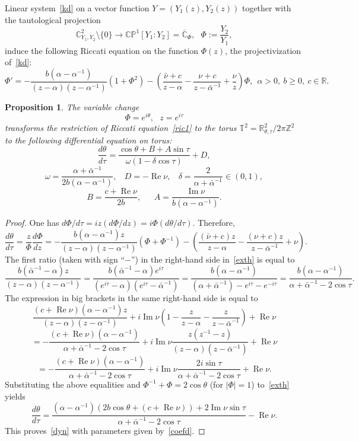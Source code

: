 \documentclass[preprint,12pt]{elsarticle}
\theoremstyle{plain}
\newtheorem{proposition}[theorem]{Proposition}
\DeclareMathOperator{\im}{\mathrm{Im}}
\DeclareMathOperator{\re}{\mathrm{Re}}
\def\a{\alpha}
\def\ba{\bar\alpha}
\def\bam{\ba^{-1}}
\def\baml{\alpha^{-1}}
\def\difa{\a-\a^{-1}}
\def\zaa{(z-\a)(z-\bam)}
\def\zaal{(z-\a)(z-\baml)}
\def\zaaa{\a+\bam-2\cos\tau}
\numberwithin{equation}{section}
\numberwithin{equation}{section}
\begin{document}
 
 Linear system~\eqref{kd} on a vector function $Y=(Y_1(z),Y_2(z))$ together with the tautological projection 
 $$\mathbb{C}^2_{Y_1,Y_2}\setminus\{0\}\to\mathbb{CP}^1[Y_1:Y_2]=\overline{\mathbb{C}}_{\Phi}, \ \ \ \Phi:=\frac{Y_2}{Y_1},$$
 induce the following Riccati equation on the function $\Phi(z)$, the projectivization of~\eqref{kd}: 
 \begin{equation}\Phi'=-\frac{b(\difa)}{\zaal}(1+\Phi^2)-\left(\frac{\bar\nu+c}{z-\a}-\frac{\nu+c}{z-\bam}+
 \frac{\nu}z\right)\Phi, \ \ \a>0, \ b\geq0, \ c\in\mathbb{R}.\label{ric1}\end{equation}
 \begin{proposition} \label{prodyn1} The variable change 
 $$\Phi=e^{i\theta}, \ \ \ z=e^{i\tau}$$
 transforms the restriction of Riccati equation~\eqref{ric1} to the  torus $\mathbb{T}^2=\mathbb{R}^2_{\theta,\tau}\slash 2\pi\mathbb{Z}^2$ 
 to the following differential equation on torus:
 \begin{equation}\frac{d\theta}{d\tau}=\frac{\cos\theta+B+A\sin\tau}{\omega(1-\delta\cos\tau)}+D,
 \label{dyn}\end{equation}
$$\omega=\frac{\a+\bam}{2b(\difa)}, \ \ \  \ D=-\re\nu, \ \ \ \ \delta=\frac2{\a+\bam}\in(0,1),$$
 \begin{equation} 
 B=\frac{c+\re\nu}{2b}, \ \ \ \ \ \ \  A=\frac{\im\nu}{b(\difa)}.\label{coefd}\end{equation}
 \end{proposition}
 \begin{proof} One has ${d\Phi}/{d\tau}=iz({d\Phi}/{dz})=i\Phi({d\theta}/{d\tau})$. Therefore,
\begin{equation}\frac{d\theta}{d\tau}=\frac{z}{\Phi}\frac{d\Phi}{dz}=-\frac{b(\difa)z}{\zaal}(\Phi+\Phi^{-1})-
 \left(\frac{(\bar\nu+c)z}{z-\a}-\frac{(\nu+c)z}{z-\bam}+
\nu\right).\label{exth}\end{equation}
The first ratio (taken with sign ``$-$'') in the  right-hand side in~\eqref{exth} is equal to 
$$\frac{b(\bam-\a)z}{\zaal}=\frac{b(\bam-\a)e^{i\tau}}{(e^{i\tau}-\a)(e^{i\tau}-\bam)}=
\frac{b(\difa)}{(\a+\bam)-e^{i\tau}-e^{-i\tau}}=\frac{b(\difa)}{\a+\bam-2\cos\tau}.$$
 The expression in big brackets in the same right-hand side is equal to 
 $$\frac{(c+\re\nu)(\difa)z}{\zaal}+i\im\nu\left(1-\frac z{z-\a}-\frac z{z-\bam}\right)+\re\nu$$
 $$=
 -\frac{(c+\re\nu)(\difa)}{\zaaa}+i\im\nu\frac{z(z^{-1}-z)}{\zaa}+\re\nu$$
 $$=-\frac{(c+\re\nu)(\difa)}{\zaaa}+i\im\nu\frac{2i\sin\tau}{\zaaa}+\re\nu.$$
 Substituting the above equalities and $\Phi^{-1}+\Phi=2\cos\theta$ (for $|\Phi|=1$)  to~\eqref{exth} yields
 $$\frac{d\theta}{d\tau}=\frac{(\difa)(2b\cos\theta+(c+\re\nu))+2\im\nu\sin\tau}{\a+\bam-2\cos\tau}-\re\nu.$$
 This proves~\eqref{dyn} with parameters given by~\eqref{coefd}.
 \end{proof}
\end{document}
